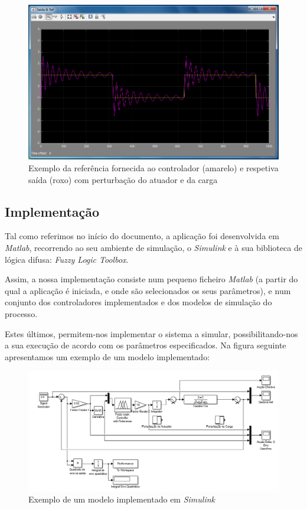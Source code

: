 \documentclass{article}
\begin{document}
\begin{figure}[H]
  \centering
      \includegraphics[scale=0.3]{Images/Mamdani_9_square_atuator_charge.png}
  \caption{Exemplo da referência fornecida ao controlador (amarelo) e respetiva saída (roxo) com perturbação do atuador e da carga}
\end{figure}


\subsection{Implementação}

Tal como referimos no início do documento, a aplicação foi desenvolvida em \emph{Matlab}, recorrendo ao seu ambiente de simulação, o \emph{Simulink} e à sua biblioteca de lógica difusa: \emph{Fuzzy Logic Toolbox}.

Assim, a nossa implementação consiste num pequeno ficheiro \emph{Matlab} (a partir do qual a aplicação é iniciada, e onde são selecionados os seus parâmetros), e num conjunto dos controladores implementados e dos modelos de simulação do processo.

Estes últimos, permitem-nos implementar o sistema a simular, possibilitando-nos a sua execução de acordo com os parâmetros especificados. Na figura seguinte apresentamos um exemplo de um modelo implementado:

\begin{figure}[H]
  \centering
      \includegraphics[scale=0.5]{Images/Controller_example.png}
  \caption{Exemplo de um modelo implementado em \emph{Simulink}}
\end{figure}
\end{document}

